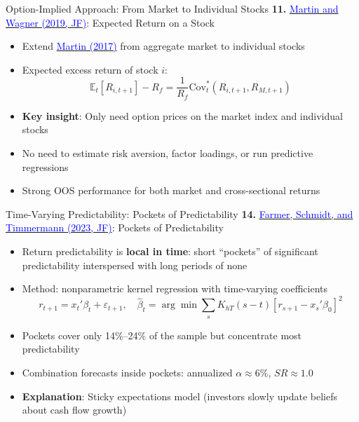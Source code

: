 \documentclass{beamer}
\begin{document}
\begin{frame}{Option-Implied Approach: From Market to Individual Stocks}
	\textbf{11.} \href{https://doi.org/10.1111/jofi.12778}{\textcolor{blue}{Martin and Wagner (2019, JF)}}: Expected Return on a Stock
	\begin{itemize}
		\item Extend \href{https://doi.org/10.1093/qje/qjw034}{\textcolor{blue}{Martin (2017)}} from aggregate market to individual stocks
		\item Expected excess return of stock $i$:
		\[
			\mathbb{E}_t[R_{i,t+1}] - R_f = \frac{1}{R_f}\text{Cov}^*_t(R_{i,t+1}, R_{M,t+1})
		\]
		\item \textbf{Key insight}: Only need option prices on the market index and individual stocks
		\item No need to estimate risk aversion, factor loadings, or run predictive regressions
		\item Strong OOS performance for both market and cross-sectional returns
	\end{itemize}
\end{frame}

\begin{frame}{Time-Varying Predictability: Pockets of Predictability}
	\textbf{14.} \href{https://doi.org/10.1111/jofi.13229}{\textcolor{blue}{Farmer, Schmidt, and Timmermann (2023, JF)}}: Pockets of Predictability
	\begin{itemize}
		\item Return predictability is \textbf{local in time}: short ``pockets'' of significant predictability interspersed with long periods of none
		\item Method: nonparametric kernel regression with time-varying coefficients
		\[
			r_{t+1} = x_t'\beta_t + \varepsilon_{t+1}, \quad \hat{\beta}_t = \arg\min \sum_{s} K_{hT}(s-t)[r_{s+1} - x_s'\beta_0]^2
		\]
		\item Pockets cover only 14\%--24\% of the sample but concentrate most predictability
		\item Combination forecasts inside pockets: annualized $\alpha \approx 6\%$, $SR \approx 1.0$
		\item \textbf{Explanation}: Sticky expectations model (investors slowly update beliefs about cash flow growth)
	\end{itemize}
\end{frame}
\end{document}
